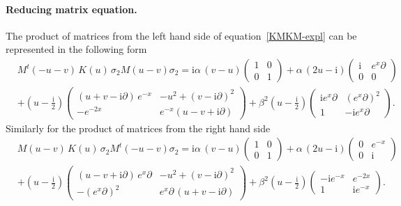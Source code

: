 \documentclass[11pt]{article}
\numberwithin{equation}{section}
\theoremstyle{plain}
\theoremstyle{definition}
\renewcommand{\imath}{\mathrm{i}}
\begin{document}
\paragraph{Reducing matrix equation.} The product of matrices from the left hand side of equation~\eqref{KMKM-expl} can be 
represented in the following form 
\begin{align*}
& M^t(-u-v) \, K(u) \, \sigma_2 M(u - v) \sigma_2 = \imath \alpha\,(v - u)
\left(\begin{array}{cc}
1 & 0 \\
0 & 1 \end{array} \right ) + \alpha\,(2u- \imath)
\left(\begin{array}{cc}
\imath & e^{x}\partial \\
0 & 0 \end{array} \right ) \\[6pt] 
& + \left(u-\frac{\imath}{2}\right)
\left(\begin{array}{cc}
(u+v-\imath\partial) \, e^{-x} & -u^2+(v-\imath\partial)^2 \\[4pt]
-e^{-2x} & e^{-x}(u-v+\imath\partial) \end{array} \right )
 + \beta^2\left(u-\frac{\imath}{2}\right)
\left(\begin{array}{cc}
\imath e^{x}\partial & (e^x\partial)^2 \\[4pt]
1 & - \imath e^{x}\partial \end{array} \right ).
\end{align*}
Similarly for the product of matrices from the right hand side
\begin{align*}
& M(u - v) \, K(u) \, \sigma_2 M^t(-u -v) \sigma_2 
= \imath \alpha\,(v - u)
\left(\begin{array}{cc}
1 & 0 \\
0 & 1 \end{array} \right ) + \alpha\,(2u-\imath)
\left(\begin{array}{cc}
0 & e^{-x} \\
0 & \imath \end{array} \right ) \\[6pt] 
& + \left(u-\frac{\imath}{2}\right)
\left(\begin{array}{cc}
(u-v+\imath\partial) \, e^{x}\partial & -u^2+(v-\imath\partial)^2 \\[4pt]
-(e^{x}\partial)^2 & e^{x}\partial\,(u+v-\imath\partial) \end{array} \right )
+ \beta^2\left(u-\frac{\imath}{2}\right)
\left(\begin{array}{cc}
- \imath e^{-x} & e^{-2x} \\[4pt]
1 & \imath e^{-x} \end{array} \right ).
\end{align*}
\end{document}
